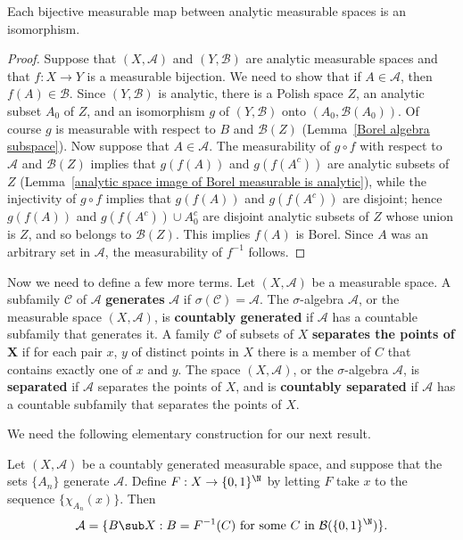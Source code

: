 \begin{proposition}\label{analytic spaces bijective measurable is iso}
Each bijective measurable map between analytic measurable spaces is an isomorphism.
\end{proposition}
\begin{proof}
Suppose that $(X,\mathcal{A})$ and $(Y,\mathcal{B})$ are analytic measurable spaces and that $f:X\to Y$ is a measurable bijection. We need to show that if $A\in\mathcal{A}$, then $f(A)\in\mathcal{B}$. Since $(Y,\mathcal{B})$ is analytic, there is a Polish space $Z$, an analytic subset $A_0$ of $Z$, and an isomorphism $g$ of $(Y,\mathcal{B})$ onto $(A_0,\mathcal{B}(A_0))$. Of course $g$ is measurable with respect to $B$ and $\mathcal{B}(Z)$ (Lemma~\ref{Borel algebra subspace}). Now suppose that $A\in\mathcal{A}$. The measurability of $g\circ f$ with respect to $\mathcal{A}$ and $\mathcal{B}(Z)$ implies that $g(f(A))$ and $g(f(A^c))$ are analytic subsets of $Z$ (Lemma~\ref{analytic space image of Borel measurable is analytic}), while the injectivity of $g\circ f$ implies that $g(f(A))$ and $g(f(A^c))$ are disjoint; hence $g(f(A))$ and $g(f(A^c))\cup A_0^c$ are disjoint analytic subsets of $Z$ whose union is $Z$, and so belongs to $\mathcal{B}(Z)$. This implies $f(A)$ is Borel. Since $A$ was an arbitrary set in $\mathcal{A}$, the measurability of $f^{-1}$ follows.
\end{proof}
Now we need to define a few more terms. Let $(X,\mathcal{A})$ be a measurable space. A subfamily $\mathcal{C}$ of $\mathcal{A}$ \textbf{generates} $\mathcal{A}$ if $\sigma(\mathcal{C})=\mathcal{A}$. The $\sigma$-algebra $\mathcal{A}$, or the measurable space $(X,\mathcal{A})$, is \textbf{countably generated} if $\mathcal{A}$ has a countable subfamily that generates it. A family $\mathcal{C}$ of subsets of $X$ \textbf{separates the points of $\bm{X}$} if for each pair $x$, $y$ of distinct points in $X$ there is a member of $C$ that contains exactly one of $x$ and $y$. The space $(X,\mathcal{A})$, or the $\sigma$-algebra $\mathcal{A}$, is \textbf{separated} if $\mathcal{A}$ separates the points of $X$, and is \textbf{countably separated} if $\mathcal{A}$ has a countable subfamily that separates the points of $X$.\par
We need the following elementary construction for our next result.
\begin{lemma}\label{measure space countably generated map to {0,1}^N}
Let $(X,\mathcal{A})$ be a countably generated measurable space, and suppose that the sets $\{A_n\}$ generate $\mathcal{A}$. Define $F:X\to\{0,1\}^\N$ by letting $F$ take $x$ to the sequence $\{\chi_{A_n}(x)\}$. Then
\begin{align*}
\mathcal{A}=\{B\sub X:B=F^{-1}(C)\text{ for some $C$ in $\mathcal{B}(\{0,1\}^\N)$}\}.
\end{align*}
\end{lemma}
